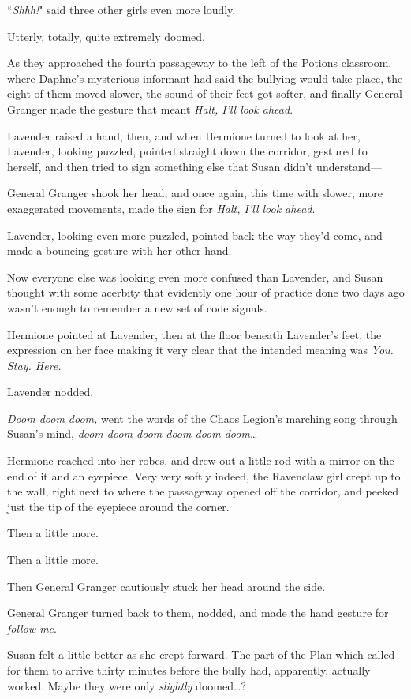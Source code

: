 ``\emph{Shhh!}" said three other girls even more loudly.

Utterly, totally, quite extremely doomed.

As they approached the fourth passageway to the left of the Potions classroom, where Daphne's mysterious informant had said the bullying would take place, the eight of them moved slower, the sound of their feet got softer, and finally General Granger made the gesture that meant \emph{Halt, I'll look ahead}.

Lavender raised a hand, then, and when Hermione turned to look at her, Lavender, looking puzzled, pointed straight down the corridor, gestured to herself, and then tried to sign something else that Susan didn't understand—

General Granger shook her head, and once again, this time with slower, more exaggerated movements, made the sign for \emph{Halt, I'll look ahead}.

Lavender, looking even more puzzled, pointed back the way they'd come, and made a bouncing gesture with her other hand.

Now everyone else was looking even more confused than Lavender, and Susan thought with some acerbity that evidently one hour of practice done two days ago wasn't enough to remember a new set of code signals.

Hermione pointed at Lavender, then at the floor beneath Lavender's feet, the expression on her face making it very clear that the intended meaning was \emph{You. Stay. Here.}

Lavender nodded.

\emph{Doom doom doom,} went the words of the Chaos Legion's marching song through Susan's mind, \emph{doom doom doom doom doom doom}{\ldots}

Hermione reached into her robes, and drew out a little rod with a mirror on the end of it and an eyepiece. Very very softly indeed, the Ravenclaw girl crept up to the wall, right next to where the passageway opened off the corridor, and peeked just the tip of the eyepiece around the corner.

Then a little more.

Then a little more.

Then General Granger cautiously stuck her head around the side.

General Granger turned back to them, nodded, and made the hand gesture for \emph{follow me}.

Susan felt a little better as she crept forward. The part of the Plan which called for them to arrive thirty minutes before the bully had, apparently, actually worked. Maybe they were only \emph{slightly} doomed{\ldots}?

